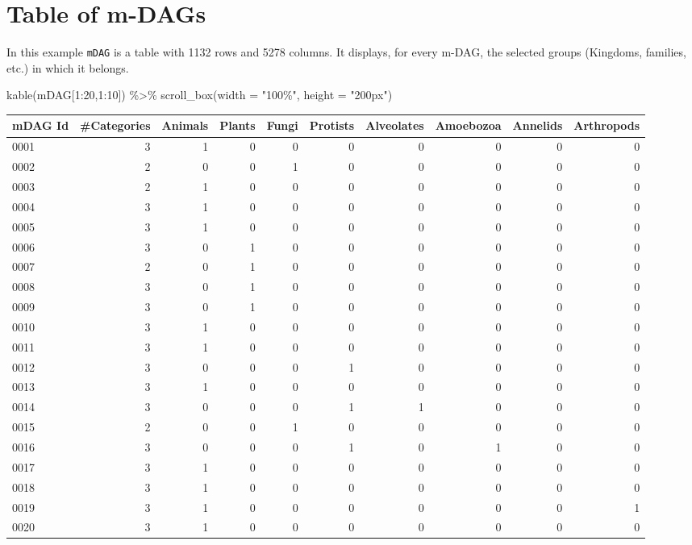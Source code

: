 \documentclass[
  letterpaper,
  DIV=11,
  numbers=noendperiod]{scrreprt}
\newenvironment{Shaded}{}{}
\newcommand{\AttributeTok}[1]{\textcolor[rgb]{0.78,0.47,0.87}{#1}}
\newcommand{\DecValTok}[1]{\textcolor[rgb]{0.82,0.60,0.40}{#1}}
\newcommand{\FunctionTok}[1]{\textcolor[rgb]{0.38,0.69,0.94}{#1}}
\newcommand{\NormalTok}[1]{\textcolor[rgb]{0.67,0.70,0.75}{#1}}
\newcommand{\SpecialCharTok}[1]{\textcolor[rgb]{0.34,0.71,0.76}{#1}}
\newcommand{\StringTok}[1]{\textcolor[rgb]{0.60,0.76,0.47}{#1}}
\begin{document}
\hypertarget{table-of-m-dags}{%
\section{Table of m-DAGs}\label{table-of-m-dags}}

In this example \texttt{mDAG} is a table with 1132 rows and 5278
columns. It displays, for every m-DAG, the selected groups (Kingdoms,
families, etc.) in which it belongs.

\begin{Shaded}
\begin{Highlighting}[]
\FunctionTok{kable}\NormalTok{(mDAG[}\DecValTok{1}\SpecialCharTok{:}\DecValTok{20}\NormalTok{,}\DecValTok{1}\SpecialCharTok{:}\DecValTok{10}\NormalTok{]) }\SpecialCharTok{\%\textgreater{}\%}   \FunctionTok{scroll\_box}\NormalTok{(}\AttributeTok{width =} \StringTok{"100\%"}\NormalTok{, }\AttributeTok{height =} \StringTok{"200px"}\NormalTok{)}
\end{Highlighting}
\end{Shaded}

\begin{tabular}{l|r|r|r|r|r|r|r|r|r}
\hline
mDAG Id & \#Categories & Animals & Plants & Fungi & Protists & Alveolates & Amoebozoa & Annelids & Arthropods\\
\hline
0001 & 3 & 1 & 0 & 0 & 0 & 0 & 0 & 0 & 0\\
\hline
0002 & 2 & 0 & 0 & 1 & 0 & 0 & 0 & 0 & 0\\
\hline
0003 & 2 & 1 & 0 & 0 & 0 & 0 & 0 & 0 & 0\\
\hline
0004 & 3 & 1 & 0 & 0 & 0 & 0 & 0 & 0 & 0\\
\hline
0005 & 3 & 1 & 0 & 0 & 0 & 0 & 0 & 0 & 0\\
\hline
0006 & 3 & 0 & 1 & 0 & 0 & 0 & 0 & 0 & 0\\
\hline
0007 & 2 & 0 & 1 & 0 & 0 & 0 & 0 & 0 & 0\\
\hline
0008 & 3 & 0 & 1 & 0 & 0 & 0 & 0 & 0 & 0\\
\hline
0009 & 3 & 0 & 1 & 0 & 0 & 0 & 0 & 0 & 0\\
\hline
0010 & 3 & 1 & 0 & 0 & 0 & 0 & 0 & 0 & 0\\
\hline
0011 & 3 & 1 & 0 & 0 & 0 & 0 & 0 & 0 & 0\\
\hline
0012 & 3 & 0 & 0 & 0 & 1 & 0 & 0 & 0 & 0\\
\hline
0013 & 3 & 1 & 0 & 0 & 0 & 0 & 0 & 0 & 0\\
\hline
0014 & 3 & 0 & 0 & 0 & 1 & 1 & 0 & 0 & 0\\
\hline
0015 & 2 & 0 & 0 & 1 & 0 & 0 & 0 & 0 & 0\\
\hline
0016 & 3 & 0 & 0 & 0 & 1 & 0 & 1 & 0 & 0\\
\hline
0017 & 3 & 1 & 0 & 0 & 0 & 0 & 0 & 0 & 0\\
\hline
0018 & 3 & 1 & 0 & 0 & 0 & 0 & 0 & 0 & 0\\
\hline
0019 & 3 & 1 & 0 & 0 & 0 & 0 & 0 & 0 & 1\\
\hline
0020 & 3 & 1 & 0 & 0 & 0 & 0 & 0 & 0 & 0\\
\hline
\end{tabular}
\end{document}
